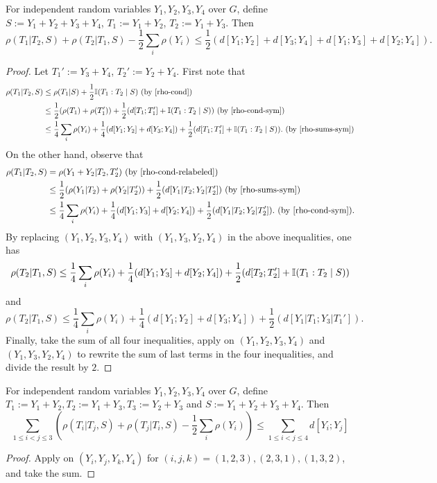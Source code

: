 \begin{lemma}\label{rho-increase}
  For independent random variables $Y_1,Y_2,Y_3,Y_4$ over $G$, define $S:=Y_1+Y_2+Y_3+Y_4$, $T_1:=Y_1+Y_2$, $T_2:=Y_1+Y_3$. Then 
  $$\rho(T_1|T_2,S)+\rho(T_2|T_1,S) - \frac{1}{2}\sum_{i} \rho(Y_i)\le \frac{1}{2}(d[Y_1;Y_2]+d[Y_3;Y_4]+d[Y_1;Y_3]+d[Y_2;Y_4]).$$
\end{lemma}
\begin{proof}
  Let $T_1':=Y_3+Y_4$, $T_2':=Y_2+Y_4$.
  First note that
  \begin{align*}
    \rho(T_1|T_2,S) 
    &\le \rho(T_1|S) + \frac{1}{2}\bbI(T_1:T_2\mid S)  \textrm{ (by \Cref{rho-cond})}\\
    &\le \frac{1}{2}(\rho(T_1)+\rho(T_1'))+\frac{1}{2}(d[T_1;T_1']+\bbI(T_1:T_2\mid S)) \textrm{ (by \Cref{rho-cond-sym})}\\
    &\le \frac{1}{4} \sum_{i} \rho(Y_i) +\frac{1}{4}(d[Y_1;Y_2]+d[Y_3;Y_4]) + \frac{1}{2}(d[T_1;T_1']+\bbI(T_1:T_2\mid S)). \textrm{ (by \Cref{rho-sums-sym})}
  \end{align*}
  On the other hand, observe that 
  \begin{align*}
    \rho(T_1|T_2,S) 
    &=\rho(Y_1+Y_2|T_2,T_2') \textrm{ (by \Cref{rho-cond-relabeled})}\\
    &\le \frac{1}{2}(\rho(Y_1|T_2)+\rho(Y_2|T_2'))+\frac{1}{2}(d[Y_1|T_2;Y_2|T_2'])  \textrm{ (by \Cref{rho-sums-sym})}\\
    &\le \frac{1}{4} \sum_{i} \rho(Y_i) +\frac{1}{4}(d[Y_1;Y_3]+d[Y_2;Y_4]) + \frac{1}{2}(d[Y_1|T_2;Y_2|T_2']). \textrm{ (by \Cref{rho-cond-sym})}.
  \end{align*}
  By replacing $(Y_1,Y_2,Y_3,Y_4)$ with $(Y_1,Y_3,Y_2,Y_4)$ in the above inequalities, one has 
  $$\rho(T_2|T_1,S) \le \frac{1}{4} \sum_{i} \rho(Y_i) +\frac{1}{4}(d[Y_1;Y_3]+d[Y_2;Y_4]) + \frac{1}{2}(d[T_2;T_2']+\mathbb{I}(T_1:T_2\mid S))$$
  and 
  $$\rho(T_2|T_1,S) \le \frac{1}{4} \sum_{i} \rho(Y_i) +\frac{1}{4}(d[Y_1;Y_2]+d[Y_3;Y_4]) + \frac{1}{2}(d[Y_1|T_1;Y_3|T_1']).$$
  Finally, take the sum of all four inequalities, apply  on $(Y_1,Y_2,Y_3,Y_4)$ and $(Y_1,Y_3,Y_2,Y_4)$ to rewrite the sum of last terms in the four inequalities, and divide the result by $2$.
\end{proof}

\begin{lemma}\label{rho-increase-symmetrized}
  For independent random variables $Y_1,Y_2,Y_3,Y_4$ over $G$, define $T_1:=Y_1+Y_2,T_2:=Y_1+Y_3,T_3:=Y_2+Y_3$ and $S:=Y_1+Y_2+Y_3+Y_4$. Then 
  $$\sum_{1 \leq i<j \leq 3} (\rho(T_i|T_j,S) + \rho(T_j|T_i,S) -  \frac{1}{2}\sum_{i} \rho(Y_i))\le \sum_{1\leq i < j \leq 4}d[Y_i;Y_j]$$
\end{lemma}
\begin{proof}
  Apply \label{rho-increase} on $(Y_i,Y_j,Y_k,Y_4)$ for $(i,j,k)=(1,2,3),(2,3,1),(1,3,2)$, and take the sum.
\end{proof}

